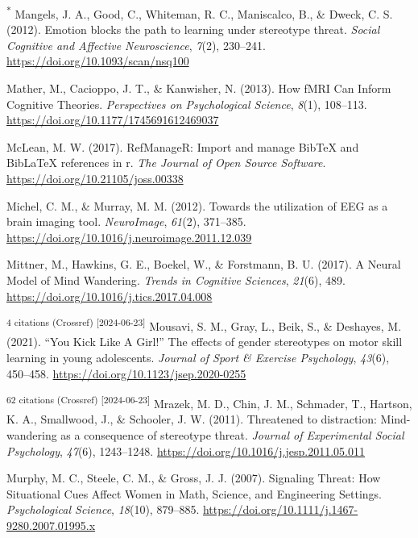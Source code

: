 \documentclass[
  stu, a4paper,floatsintext]{apa7}
\newlength{\cslhangindent}
\newenvironment{CSLReferences}[2] %
 {\begin{list}{}{%
  \setlength{\itemindent}{0pt}
  \setlength{\leftmargin}{0pt}
  \setlength{\parsep}{0pt}
  \ifodd #1
   \setlength{\leftmargin}{\cslhangindent}
   \setlength{\itemindent}{-1\cslhangindent}
  \fi
  \setlength{\itemsep}{#2\baselineskip}}}
 {\end{list}}
\begin{document}
\begin{CSLReferences}{1}{0}
\textsuperscript{*} Mangels, J. A., Good, C., Whiteman, R. C., Maniscalco, B., \& Dweck, C. S. (2012). Emotion blocks the path to learning under stereotype threat. \emph{Social Cognitive and Affective Neuroscience}, \emph{7}(2), 230--241. \url{https://doi.org/10.1093/scan/nsq100}

Mather, M., Cacioppo, J. T., \& Kanwisher, N. (2013). How {fMRI Can Inform Cognitive Theories}. \emph{Perspectives on Psychological Science}, \emph{8}(1), 108--113. \url{https://doi.org/10.1177/1745691612469037}

McLean, M. W. (2017). RefManageR: Import and manage BibTeX and BibLaTeX references in r. \emph{The Journal of Open Source Software}. \url{https://doi.org/10.21105/joss.00338}

Michel, C. M., \& Murray, M. M. (2012). Towards the utilization of {EEG} as a brain imaging tool. \emph{NeuroImage}, \emph{61}(2), 371--385. \url{https://doi.org/10.1016/j.neuroimage.2011.12.039}

Mittner, M., Hawkins, G. E., Boekel, W., \& Forstmann, B. U. (2017). A {Neural Model} of {Mind Wandering}. \emph{Trends in Cognitive Sciences}, \emph{21}(6), 489. \url{https://doi.org/10.1016/j.tics.2017.04.008}

\textsuperscript{4 citations (Crossref) {[}2024-06-23{]}} Mousavi, S. M., Gray, L., Beik, S., \& Deshayes, M. (2021). {``{You Kick Like A Girl}!''} The effects of gender stereotypes on motor skill learning in young adolescents. \emph{Journal of Sport \& Exercise Psychology}, \emph{43}(6), 450--458. \url{https://doi.org/10.1123/jsep.2020-0255}

\textsuperscript{62 citations (Crossref) {[}2024-06-23{]}} Mrazek, M. D., Chin, J. M., Schmader, T., Hartson, K. A., Smallwood, J., \& Schooler, J. W. (2011). Threatened to distraction: {Mind-wandering} as a consequence of stereotype threat. \emph{Journal of Experimental Social Psychology}, \emph{47}(6), 1243--1248. \url{https://doi.org/10.1016/j.jesp.2011.05.011}

Murphy, M. C., Steele, C. M., \& Gross, J. J. (2007). Signaling {Threat}: {How Situational Cues Affect Women} in {Math}, {Science}, and {Engineering Settings}. \emph{Psychological Science}, \emph{18}(10), 879--885. \url{https://doi.org/10.1111/j.1467-9280.2007.01995.x}


\end{CSLReferences}
\end{document}
